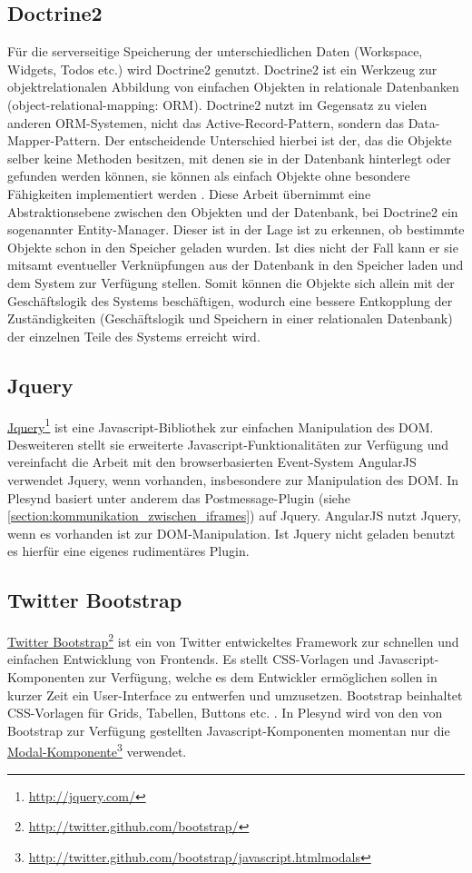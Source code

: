 \subsection{Doctrine2}\label{section:doctrine2}
Für die serverseitige Speicherung der unterschiedlichen Daten (Workspace, Widgets, Todos etc.) wird Doctrine2 genutzt. Doctrine2 ist ein Werkzeug zur objektrelationalen Abbildung von einfachen Objekten in relationale Datenbanken (object-relational-mapping: ORM). Doctrine2 nutzt im Gegensatz zu vielen anderen ORM-Systemen, nicht das Active-Record-Pattern, sondern das Data-Mapper-Pattern. Der entscheidende Unterschied hierbei ist der, das die Objekte selber keine Methoden besitzen, mit denen sie in der Datenbank hinterlegt oder gefunden werden können, sie können als einfach Objekte ohne besondere Fähigkeiten implementiert werden \cite{fowler_data_mapper}. Diese Arbeit übernimmt eine Abstraktionsebene zwischen den Objekten und der Datenbank, bei Doctrine2 ein sogenannter Entity-Manager. Dieser ist in der Lage ist zu erkennen, ob bestimmte Objekte schon in den Speicher geladen wurden. Ist dies nicht der Fall kann er sie mitsamt eventueller Verknüpfungen aus der Datenbank in den Speicher laden und dem System zur Verfügung stellen. Somit können die Objekte sich allein mit der Geschäftslogik des Systems beschäftigen, wodurch eine bessere Entkopplung der Zuständigkeiten (Geschäftslogik und Speichern in einer relationalen Datenbank) der einzelnen Teile des Systems erreicht wird.

\subsection{Jquery}
\href{http://jquery.com/}{Jquery}\footnote{\url{http://jquery.com/}} ist eine Javascript-Bibliothek zur einfachen Manipulation des DOM. Desweiteren stellt sie erweiterte Javascript-Funktionalitäten zur Verfügung und vereinfacht die Arbeit mit den browserbasierten Event-System AngularJS verwendet Jquery, wenn vorhanden, insbesondere zur Manipulation des DOM. In Plesynd basiert unter anderem das Postmessage-Plugin (siehe \ref{section:kommunikation_zwischen_iframes}) auf Jquery. AngularJS nutzt Jquery, wenn es vorhanden ist zur DOM-Manipulation. Ist Jquery nicht geladen benutzt es hierfür eine eigenes rudimentäres Plugin.

\subsection{Twitter Bootstrap}
\href{http://twitter.github.com/bootstrap/}{Twitter Bootstrap}\footnote{\url{http://twitter.github.com/bootstrap/}} ist ein von Twitter entwickeltes Framework zur schnellen und einfachen Entwicklung von Frontends. Es stellt CSS-Vorlagen und Javascript-Komponenten zur Verfügung, welche es dem Entwickler ermöglichen sollen in kurzer Zeit ein User-Interface zu entwerfen und umzusetzen. Bootstrap beinhaltet CSS-Vorlagen für Grids, Tabellen, Buttons etc. . In Plesynd wird von den von Bootstrap zur Verfügung gestellten Javascript-Komponenten momentan nur die \href{http://twitter.github.com/bootstrap/javascript.htmlmodals}{Modal-Komponente}\footnote{\url{http://twitter.github.com/bootstrap/javascript.htmlmodals}} verwendet. 

